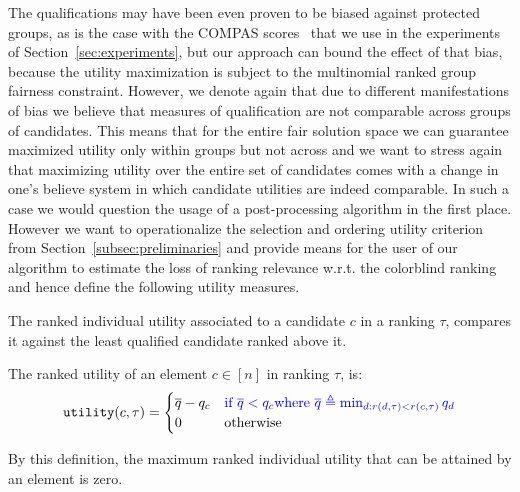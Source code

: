 The qualifications may have been even proven to be biased against protected groups, as is the case with the COMPAS scores~\cite{angwin_2016_machine} that we use in the experiments of Section~\ref{sec:experiments}, but our approach can bound the effect of that bias, because the utility maximization is subject to the multinomial ranked group fairness constraint.
%
However, we denote again that due to different manifestations of bias we believe that measures of qualification are not comparable across groups of candidates.
%
This means that for the entire fair solution space we can guarantee maximized utility only within groups but not across and we want to stress again that maximizing utility over the entire set of candidates comes with a change in one's believe system in which candidate utilities are indeed comparable.
%
In such a case we would question the usage of a post-processing algorithm in the first place.
%
However we want to operationalize the selection and ordering utility criterion from Section~\ref{subsec:preliminaries} and provide means for the user of our algorithm to estimate the loss of ranking relevance w.r.t. the colorblind ranking and hence define the following utility measures.


The ranked individual utility associated to a candidate $c$ in a ranking $\tau$, compares it against the least qualified candidate ranked above it.

\begin{definition}
	\label{def:rankedIndividualFairness}
	The ranked utility of an element $c \in [n]$ in ranking $\tau$, is:
	\[
	\texttt{utility}(c,\tau) = \begin{cases}
	\overline{q} - q_c &\textcolor[rgb]{0.00,0.00,1.00}{ \textrm{if~} \overline{q} < q_c \textrm{where~} \overline{q}\triangleq \min_{d: r(d,\tau) < r(c,\tau)} q_d } \\
	0 & \textrm{otherwise}\\
	\end{cases}
	\]
\end{definition}
%
\noindent By this definition, the maximum ranked individual utility that can be attained by an element is zero. %
%

